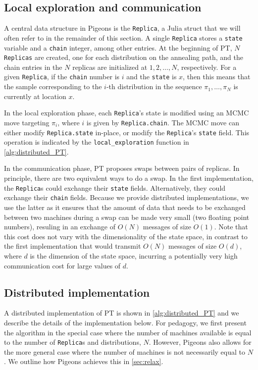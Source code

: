 \subsection{Local exploration and communication}
A central data structure in Pigeons is the \texttt{Replica}, a Julia struct 
that we will often refer to in the remainder of this section. 
A single \texttt{Replica} stores a \texttt{state} variable and a \texttt{chain} 
integer, among other entries. 
At the beginning of PT, $N$ \texttt{Replicas} are created, 
one for each distribution on the annealing path, and 
the chain entries in the $N$ replicas are initialized at $1,2,\ldots,N$, respectively. 
For a given \texttt{Replica}, if the \texttt{chain} number is $i$ and the \texttt{state}
is $x$, then this means that the sample corresponding to the $i$-th distribution in 
the sequence $\pi_1, \ldots, \pi_N$ is currently at location $x$.  

\medskip 
In the local exploration phase,
each \texttt{Replica}'s state is modified using an MCMC move targeting $\pi_i$,
where $i$ is given by \texttt{Replica.chain}.
The MCMC move can either modify \texttt{Replica.state} in-place, or modify the 
\texttt{Replica}'s \texttt{state} field. 
This operation is indicated by the \texttt{local\_exploration} function in 
\cref{alg:distributed_PT}.

\medskip 
In the communication phase, PT proposes swaps between pairs of replicas. 
In principle, there are two equivalent ways to do a swap.
In the first implementation, the \texttt{Replica}s 
could exchange their \texttt{state} fields.
Alternatively, they could exchange their \texttt{chain} fields.
Because we provide distributed implementations, we use the latter as it ensures that 
the amount of data that needs to be exchanged between two machines during a swap 
can be made very small (two floating point numbers), resuling in 
an exchange of $O(N)$ messages of size $O(1)$. 
Note that this cost does not vary with the dimensionality of the state space, 
in contrast to the first implementation that would transmit 
$O(N)$ messages of size $O(d)$, where $d$ is the dimension of the state space,
incurring a potentially very high communication cost for large values of $d$.


\subsection{Distributed implementation}
A distributed implementation of PT is shown in \cref{alg:distributed_PT}
and we describe the details of the implementation below.
For pedagogy, we first present the algorithm in the special case where the number of machines available 
is equal to the number of \texttt{Replica}s and distributions, $N$. 
However, Pigeons also allows for the more general case where the number of 
machines is not necessarily equal to $N$.
We outline how Pigeons achieves this in \cref{sec:relax}.


